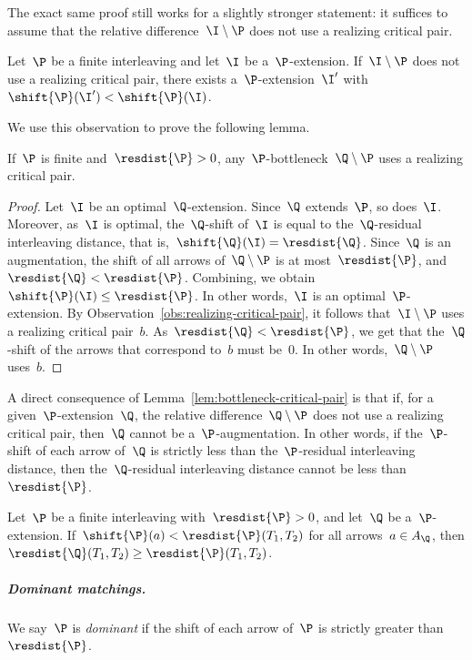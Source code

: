 The exact same proof still works for a slightly stronger statement: it suffices to assume that the relative difference~$\I \setminus \P$ does not use a realizing critical pair.
\begin{observation}\label{obs:realizing-critical-pair}
Let~$\P$ be a finite interleaving and let~$\I$ be a~$\P$-extension.
If~$\I \setminus \P$ does not use a realizing critical pair, there exists a~$\P$-extension~$\I'$ with~$\shift{\P}(\I') < \shift{\P}(\I)$.
\end{observation}
We use this observation to prove the following lemma.
%
\begin{lemma}\label{lem:bottleneck-critical-pair}
    If~$\P$ is finite and~$\resdist{\P} > 0$, any~$\P$-bottleneck~$\Q \setminus \P$ uses a realizing critical pair.
\end{lemma}
\begin{proof}
    Let~$\I$ be an optimal~$\Q$-extension.
    Since~$\Q$ extends~$\P$, so does~$\I$.
    Moreover, as~$\I$ is optimal, the~$\Q$-shift of~$\I$ is equal to the~$\Q$-residual interleaving distance, that is,~$\shift{\Q}(\I) = \resdist{\Q}$.
    Since~$\Q$ is an augmentation, the shift of all arrows of~$\Q \setminus \P$ is at most~$\resdist{\P}$, and~$\resdist{\Q} < \resdist{\P}$.
    Combining, we obtain~$\shift{\P}(\I) \le \resdist{\P}$.
    In other words,~$\I$ is an optimal~$\P$-extension.
    By Observation~\ref{obs:realizing-critical-pair}, it follows that~$\I \setminus \P$ uses a realizing critical pair~$b$.
    As~$\resdist{\Q} < \resdist{\P}$, we get that the~$\Q$-shift of the arrows that correspond to~$b$ must be~$0$.
    In other words,~$\Q \setminus \P$ uses~$b$.
\end{proof}
%
%
\noindent
A direct consequence of Lemma~\ref{lem:bottleneck-critical-pair} is that if, for a given~$\P$-extension~$\Q$, the relative difference~$\Q \setminus \P$ does not use a realizing critical pair, then~$\Q$ cannot be a~$\P$-augmentation.
In other words, if the~$\P$-shift of each arrow of~$\Q$ is strictly less than the~$\P$-residual interleaving distance, then the~$\Q$-residual interleaving distance cannot be less than~$\resdist{\P}$.
%
\begin{corollary}\label{cor:helper-lemma}
    Let~$\P$ be a finite interleaving with~$\resdist{\P} > 0$, and let~$\Q$ be a~$\P$-extension.
    If~$\shift{\P}(a) < \resdist{\P}(T_1, T_2)$ for all arrows~$a \in A_\Q$, then $\resdist{\Q}(T_1, T_2) \ge \resdist{\P}(T_1, T_2)$.
\end{corollary}
%
\subparagraph{Dominant matchings.}
We say~$\P$ is \emph{dominant} if the shift of each arrow of~$\P$ is strictly greater than~$\resdist{\P}$.
